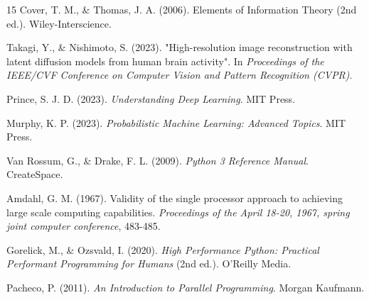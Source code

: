 \documentclass{article}
\begin{document}
\begin{thebibliography}{15}
     Cover, T. M., \& Thomas, J. A. (2006). Elements of Information Theory (2nd ed.). Wiley-Interscience.

     Takagi, Y., \& Nishimoto, S. (2023). "High-resolution image reconstruction with latent diffusion models from human brain activity". In \textit{Proceedings of the IEEE/CVF Conference on Computer Vision and Pattern Recognition (CVPR)}.
    
     Prince, S. J. D. (2023). \textit{Understanding Deep Learning}. MIT Press.
    
     Murphy, K. P. (2023). \textit{Probabilistic Machine Learning: Advanced Topics}. MIT Press.

     Van Rossum, G., \& Drake, F. L. (2009). \textit{Python 3 Reference Manual}. CreateSpace.
    
     Amdahl, G. M. (1967). Validity of the single processor approach to achieving large scale computing capabilities. \textit{Proceedings of the April 18-20, 1967, spring joint computer conference}, 483-485.

     Gorelick, M., \& Ozsvald, I. (2020). \textit{High Performance Python: Practical Performant Programming for Humans} (2nd ed.). O'Reilly Media.

     Pacheco, P. (2011). \textit{An Introduction to Parallel Programming}. Morgan Kaufmann.

\end{thebibliography}

\end{document}
